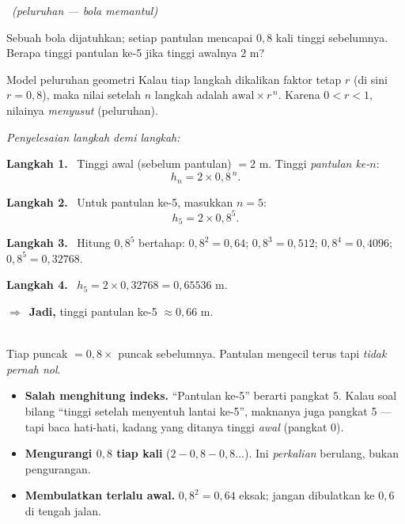 \documentclass[11pt,a4paper]{report}
\theoremstyle{gaya}
\newcommand{\jawab}{\par\smallskip\noindent\textit{\textcolor{oranye}{Penyelesaian langkah demi langkah:}}\par\smallskip}
\newcommand{\langkah}[1]{\par\smallskip\noindent\textbf{\textcolor{biru}{Langkah #1.}}\ }
\newcommand{\jadi}{\par\smallskip\noindent$\Rightarrow$\ \textbf{Jadi, }}
\newcommand{\soalno}[2]{%
  \par\bigskip
  \noindent{\large\bfseries\color{ungu}\rule[-2pt]{4pt}{14pt}\ Soal #1}%
  \ {\normalfont\itshape\color{gray}(#2)}\par\nopagebreak\smallskip}
\begin{document}
\soalno{1.1.7}{peluruhan — bola memantul}
\begin{soalbox}{}
Sebuah bola dijatuhkan; setiap pantulan mencapai $0{,}8$ kali tinggi
sebelumnya. Berapa tinggi pantulan ke-5 jika tinggi awalnya $2$ m?
\end{soalbox}

\begin{ingat}{Model peluruhan geometri}
Kalau tiap langkah dikalikan faktor tetap $r$ (di sini $r=0{,}8$), maka nilai
setelah $n$ langkah adalah $\text{awal}\times r^{\,n}$. Karena $0<r<1$, nilainya
\emph{menyusut} (peluruhan).
\end{ingat}

\jawab
\langkah{1} Tinggi awal (sebelum pantulan) $=2$ m. Tinggi \emph{pantulan ke-$n$}:
\[
h_n = 2 \times 0{,}8^{\,n}.
\]
\langkah{2} Untuk pantulan ke-5, masukkan $n=5$:
\[
h_5 = 2\times 0{,}8^{5}.
\]
\langkah{3} Hitung $0{,}8^5$ bertahap:
$0{,}8^2=0{,}64$; $0{,}8^3=0{,}512$; $0{,}8^4=0{,}4096$; $0{,}8^5=0{,}32768$.
\langkah{4} $h_5 = 2\times 0{,}32768 = 0{,}65536$ m.
\jadi tinggi pantulan ke-5 $\approx 0{,}66$ m.

\begin{center}
\\
{\small Tiap puncak $=0{,}8\times$ puncak sebelumnya. Pantulan mengecil terus
tapi \emph{tidak pernah nol}.}
\end{center}

\begin{jebakan}
\begin{itemize}[leftmargin=*,topsep=2pt]
  \item \textbf{Salah menghitung indeks.} ``Pantulan ke-5'' berarti pangkat $5$.
  Kalau soal bilang ``tinggi setelah menyentuh lantai ke-5'', maknanya juga
  pangkat 5 --- tapi baca hati-hati, kadang yang ditanya tinggi \emph{awal}
  (pangkat 0).
  \item \textbf{Mengurangi $0{,}8$ tiap kali} ($2-0{,}8-0{,}8\dots$). Ini
  \emph{perkalian} berulang, bukan pengurangan.
  \item \textbf{Membulatkan terlalu awal.} $0{,}8^2=0{,}64$ eksak; jangan
  dibulatkan ke $0{,}6$ di tengah jalan.
\end{itemize}
\end{jebakan}
\end{document}
